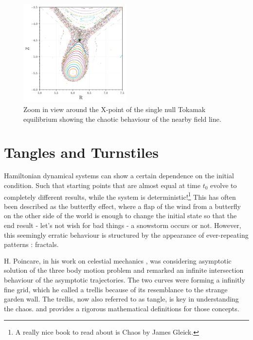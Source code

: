 \begin{figure}
    \centering
    \includegraphics[width=0.5\textwidth]{images/toytok/perturbed-6-1/perturbed_6_1_closer.png}
    \caption{Zoom in view around the X-point of the single null Tokamak equilibrium showing the chaotic behaviour of the nearby field line.}
    \label{fig:xpoint-chaos}
\end{figure}

\chapter{Tangles and Turnstiles}\label{ch:tangleandturns}

Hamiltonian dynamical systems can show a certain dependence on the initial condition. Such that starting points that are almost equal at time $t_0$ evolve to completely different results, while the system is deterministic!\footnote{A really nice book to read about is Chaos by James Gleick.} This has often been described as the butterfly effect, where a flap of the wind from a butterfly on the other side of the world is enough to change the initial state so that the end result - let's not wish for bad things - a snowstorm occurs or not. However, this seemingly erratic behaviour is structured by the appearance of ever-repeating patterns : fractals. 

H. Poincare, in his work on celestial mechanics \cite{poincare_methodes_1899}, was considering asymptotic solution of the three body motion problem and remarked an infinite intersection behaviour of the asymptotic trajectories. The two curves were forming a infinitly fine grid, which he called a trellis because of its resemblance to the strange garden wall. The trellis, now also referred to as tangle, is key in understanding the chaos. \citeauthor{hohloch_transport_2012} and \cite{hohloch_homoclinic_2017} provides a rigorous mathematical definitions for those concepts.

